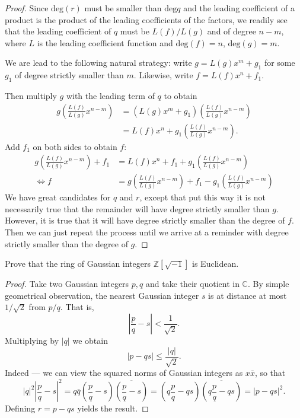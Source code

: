 \begin{proof}
Since $\text{deg}(r)$ must be smaller than
$\text{deg}q$
and the leading coefficient of a product is
the
product of the leading coefficients of the
factors,
we readily see that the leading coefficient
of $q$ must
be $L(f)/L(g)$ and of degree $n-m$, where $L$
is the leading
coefficient function and $\text{deg}(f)=n$,
$\text{deg}(g)=m$.

We are lead to the following natural
strategy:
write $g=L(g)x^m+g_1$ for some $g_1$ of
degree
strictly smaller than $m$. Likewise, write
$f=L(f)x^n+f_1$.

Then multiply $g$ with the leading term of
$q$ to obtain
$$
\begin{aligned}
g
\left(\frac{L(f)}{L(g)}x^{n-m}\right)&=(L(g)
x^m+g_1)
\left(\frac{L(f)}{L(g)}x^{n-m}\right)\\
&=L(f)x^n+g_1\left(\frac{L(f)}{L(g)}x^{n-m}
\right).
\end{aligned}
$$
Add $f_1$ on both sides to obtain $f$:
$$
\begin{aligned}
g\left(\frac{L(f)}{L(g)}x^{n-m}\right)+f_1&=
L(f)x^n+f_1+
g_1\left(\frac{L(f)}{L(g)}x^{n-m}\right)\\
\iff
f&=g\left(\frac{L(f)}{L(g)}x^{n-m}\right)+f_1
-g_1\left(\frac{L(f)}{L(g)}x^{n-m}\right)
\end{aligned}
$$
We have great candidates for $q$ and $r$,
except that put this way
it is not necessarily true that the remainder
will have degree
strictly smaller than $g$. However, it is
true that it
will have degree strictly smaller than the
degree of $f$.
Then we can just repeat
the process until we arrive at a reminder
with degree
strictly smaller than the degree of $g$.
\end{proof}

\begin{exercise}
\label{exercise-gaussian-integers-euclidean}
Prove that the ring of Gaussian integers
$\mathbb{Z}[\sqrt{-1}]$ is Euclidean.
\end{exercise}

\begin{proof}
Take two Gaussian integers $p,q$ and
take their quotient in $\mathbb{C}$.
By simple geometrical observation,
the nearest Gaussian integer $s$
is at distance at most $1/\sqrt{2}$
from $p/q$. That is,
$$
\left|\frac{p}{q}-s\right|<\frac{1}{\sqrt{2}}
.
$$
Multiplying by $|q|$ we obtain
$$
|p-qs|\leq \frac{|q|}{\sqrt{2}}.
$$
Indeed --- we can view the squared norms
of Gaussian integers as $x \bar{x}$, so that
$$
|q|^2\left|\frac{p}{q}-s\right|^2
=q\bar{q}\left(
\frac{p}{q}-s\right)
\overline{\left(\frac{p}{q}-s\right)}
=\left(q\frac{p}{q}-qs\right)
\overline{\left(q\frac{p}{q}-qs\right)}
=|p-qs|^2.
$$
Defining $r=p-qs$ yields the result.
\end{proof}

